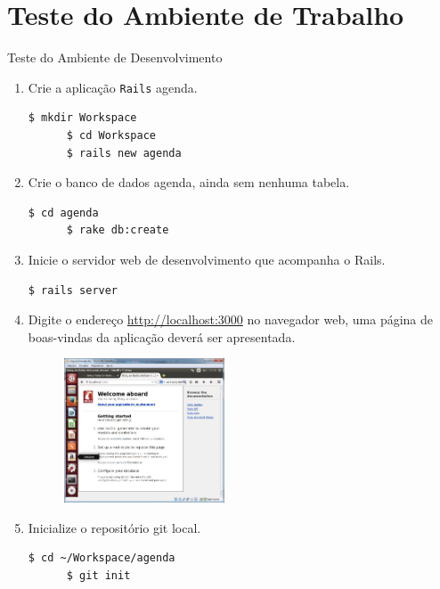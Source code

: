 \section{Teste do Ambiente de Trabalho}
\begin{frame}{Teste do Ambiente de Desenvolvimento}
  \begin{enumerate}
    \item Crie a aplicação \verb!Rails! \alert{agenda}.
    \begin{lstlisting}[style=BashInputStyle]
	  $ mkdir Workspace
	  $ cd Workspace
	  $ rails new agenda
    \end{lstlisting}
 
    \item Crie o banco de dados \alert{agenda}, ainda sem nenhuma tabela.
    \begin{lstlisting}[style=BashInputStyle]
	  $ cd agenda
	  $ rake db:create
    \end{lstlisting}

    \item Inicie o servidor web de desenvolvimento que acompanha o Rails.
    \begin{lstlisting}[style=BashInputStyle]
	  $ rails server
    \end{lstlisting}

\framebreak
    \item Digite o endereço \alert{\url{http://localhost:3000}} no navegador web, uma página 
      de boas-vindas da aplicação deverá ser apresentada.
    \begin{figure}[h!]
	\centering
	\includegraphics[width=0.45\textwidth]{devops/imagens/rails-boas-vindas.jpg}
    \end{figure}

\framebreak
    \item Inicialize o repositório git local.
    \begin{lstlisting}[style=BashInputStyle]
	  $ cd ~/Workspace/agenda
	  $ git init
    \end{lstlisting}
 

\end{enumerate}
\end{frame}
